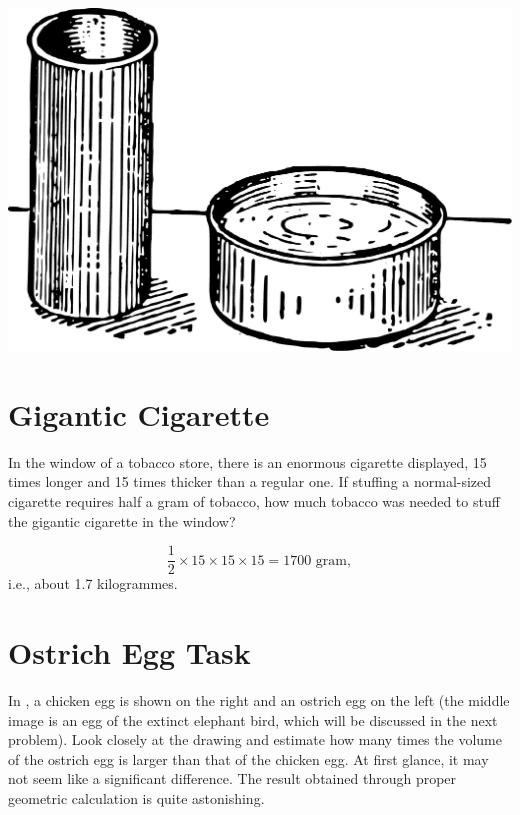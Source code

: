 \begin{marginfigure}[-2cm]%
\centering
\includegraphics[width=\textwidth]{figures/ch-11/fig-166.pdf}
\end{marginfigure}


\section{Gigantic Cigarette}
\label{sec-11.5}


\ques In the window of a tobacco store, there is an enormous cigarette displayed, 15 times longer and 15 times thicker than a regular one. If stuffing a normal-sized cigarette requires half a gram of tobacco, how much tobacco was needed to stuff the gigantic cigarette in the window?

\ans \begin{equation*}%
\frac{1}{2} \times 15 \times 15 \times 15 = 1700 \,\, \text{gram}, 
\end{equation*}
i.e., about 1.7 kilogrammes.

\section{Ostrich Egg Task}
\label{sec-11.6}

\ques In , a chicken egg is shown on the right and an ostrich egg on the left (the middle image is an egg of the extinct elephant bird, which will be discussed in the next problem). Look closely at the drawing and estimate how many times the volume of the ostrich egg is larger than that of the chicken egg. At first glance, it may not seem like a significant difference. The result obtained through proper geometric calculation is quite astonishing.



